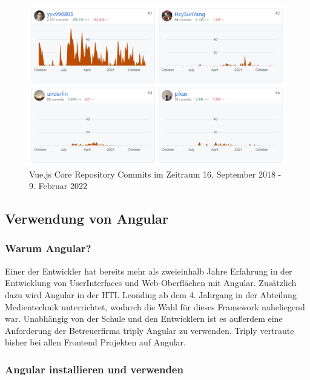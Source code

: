 \begin{figure}[hbt!]
    \centering
    \includegraphics[scale=0.8]{pics/vue_contributions}
    \caption{Vue.js Core Repository Commits im Zeitraum 16. September 2018 - 9. Februar 2022~\cite{VueJSContribution}}
    \label{fig:vue_contributions}
\end{figure}

\subsection{Verwendung von Angular}

\subsubsection{Warum Angular?}
Einer der Entwickler hat bereits mehr als zweieinhalb Jahre Erfahrung in der Entwicklung von UserInterfaces und Web-Oberflächen mit Angular.
Zusätzlich dazu wird Angular in der HTL Leonding ab dem 4. Jahrgang in der Abteilung Medientechnik unterrichtet, wodurch
die Wahl für dieses Framework naheliegend war.
Unabhängig von der Schule und den Entwicklern ist es außerdem eine Anforderung der Betreuerfirma triply Angular zu verwenden.
Triply vertraute bisher bei allen Frontend Projekten auf Angular.

\subsubsection{Angular installieren und verwenden}

